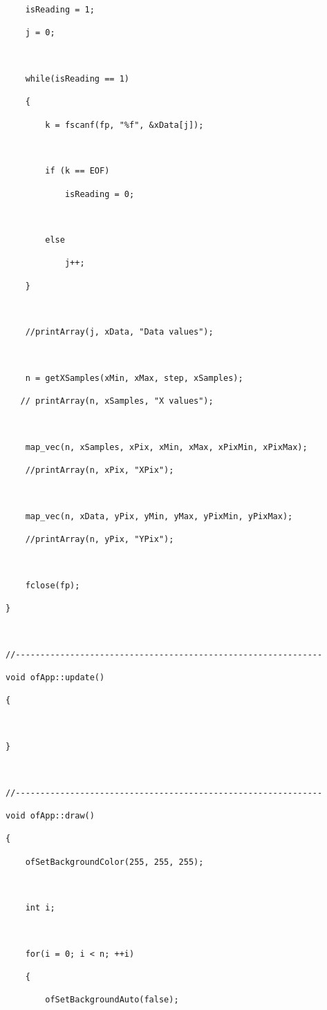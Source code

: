 \documentclass[letterpaper, 24pt, final, onecolumn, titlepage] {article}
\begin{document}
\begin{lstlisting}
    isReading = 1;

    j = 0;



    while(isReading == 1)

    {

        k = fscanf(fp, "%f", &xData[j]);



        if (k == EOF)

            isReading = 0;



        else

            j++;

    }



    //printArray(j, xData, "Data values");



    n = getXSamples(xMin, xMax, step, xSamples);

   // printArray(n, xSamples, "X values");



    map_vec(n, xSamples, xPix, xMin, xMax, xPixMin, xPixMax);

    //printArray(n, xPix, "XPix");



    map_vec(n, xData, yPix, yMin, yMax, yPixMin, yPixMax);

    //printArray(n, yPix, "YPix");



    fclose(fp);

}



//--------------------------------------------------------------

void ofApp::update()

{



}



//--------------------------------------------------------------

void ofApp::draw()

{

    ofSetBackgroundColor(255, 255, 255);



    int i;



    for(i = 0; i < n; ++i)

    {

        ofSetBackgroundAuto(false);


\end{lstlisting}
\end{document}
